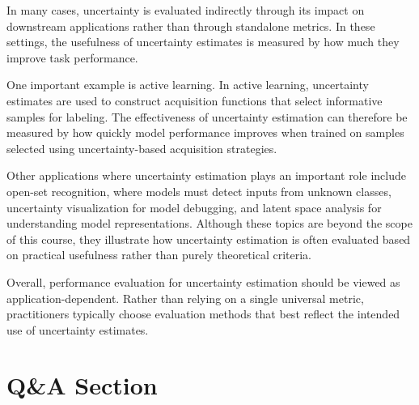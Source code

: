 \documentclass{article}
\begin{document}
In many cases, uncertainty is evaluated indirectly through its impact on downstream applications rather than through standalone metrics. In these settings, the usefulness of uncertainty estimates is measured by how much they improve task performance.

One important example is active learning. In active learning, uncertainty estimates are used to construct acquisition functions that select informative samples for labeling. The effectiveness of uncertainty estimation can therefore be measured by how quickly model performance improves when trained on samples selected using uncertainty-based acquisition strategies.

Other applications where uncertainty estimation plays an important role include open-set recognition, where models must detect inputs from unknown classes, uncertainty visualization for model debugging, and latent space analysis for understanding model representations. Although these topics are beyond the scope of this course, they illustrate how uncertainty estimation is often evaluated based on practical usefulness rather than purely theoretical criteria.

Overall, performance evaluation for uncertainty estimation should be viewed as application-dependent. Rather than relying on a single universal metric, practitioners typically choose evaluation methods that best reflect the intended use of uncertainty estimates.

\section{Q\&A Section}
\end{document}
